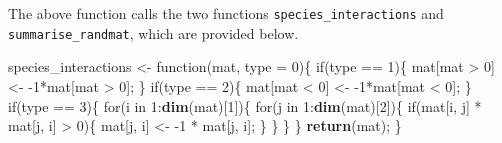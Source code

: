 \documentclass[]{article}
\newenvironment{Shaded}{\begin{snugshade}}{\end{snugshade}}
\newcommand{\KeywordTok}[1]{\textcolor[rgb]{0.13,0.29,0.53}{\textbf{{#1}}}}
\newcommand{\DataTypeTok}[1]{\textcolor[rgb]{0.13,0.29,0.53}{{#1}}}
\newcommand{\DecValTok}[1]{\textcolor[rgb]{0.00,0.00,0.81}{{#1}}}
\newcommand{\StringTok}[1]{\textcolor[rgb]{0.31,0.60,0.02}{{#1}}}
\newcommand{\NormalTok}[1]{{#1}}
\begin{document}
The above function calls the two functions
\texttt{species\_interactions} and \texttt{summarise\_randmat}, which
are provided below.

\begin{Shaded}
\begin{Highlighting}[]
\NormalTok{species_interactions <-}\StringTok{ }\NormalTok{function(mat, }\DataTypeTok{type =} \DecValTok{0}\NormalTok{)\{}
    \NormalTok{if(type ==}\StringTok{ }\DecValTok{1}\NormalTok{)\{}
        \NormalTok{mat[mat >}\StringTok{ }\DecValTok{0}\NormalTok{] <-}\StringTok{ }\NormalTok{-}\DecValTok{1}\NormalTok{*mat[mat >}\StringTok{ }\DecValTok{0}\NormalTok{];}
    \NormalTok{\}}
    \NormalTok{if(type ==}\StringTok{ }\DecValTok{2}\NormalTok{)\{}
        \NormalTok{mat[mat <}\StringTok{ }\DecValTok{0}\NormalTok{] <-}\StringTok{ }\NormalTok{-}\DecValTok{1}\NormalTok{*mat[mat <}\StringTok{ }\DecValTok{0}\NormalTok{];}
    \NormalTok{\}}
    \NormalTok{if(type ==}\StringTok{ }\DecValTok{3}\NormalTok{)\{}
        \NormalTok{for(i in }\DecValTok{1}\NormalTok{:}\KeywordTok{dim}\NormalTok{(mat)[}\DecValTok{1}\NormalTok{])\{}
            \NormalTok{for(j in }\DecValTok{1}\NormalTok{:}\KeywordTok{dim}\NormalTok{(mat)[}\DecValTok{2}\NormalTok{])\{}
                \NormalTok{if(mat[i, j] *}\StringTok{ }\NormalTok{mat[j, i] >}\StringTok{ }\DecValTok{0}\NormalTok{)\{}
                    \NormalTok{mat[j, i] <-}\StringTok{ }\NormalTok{-}\DecValTok{1} \NormalTok{*}\StringTok{ }\NormalTok{mat[j, i];}
                \NormalTok{\}}
            \NormalTok{\}}
        \NormalTok{\}}
    \NormalTok{\}}
    \KeywordTok{return}\NormalTok{(mat);}
\NormalTok{\}}


\end{Highlighting}
\end{Shaded}
\end{document}
